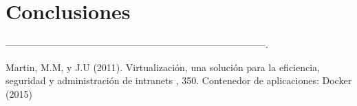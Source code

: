 \documentclass[twoside,twocolumn]{article}
\begin{document}
\section{Conclusiones}

---------------------------------------------------------------------------------.

\begin{thebibliography}{99} %

Martin, M.M,  y J.U (2011).
\newblock Virtualización, una solución para la eficiencia,
seguridad y administración de intranets
, 350.
\newblock Contenedor de aplicaciones: Docker (2015)
 
 
\end{thebibliography}

\end{document}
